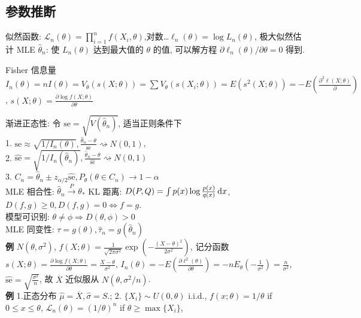 \documentclass[a4paper, landscape,10pt]{article}
\begin{document}
\begin{multicols}{4}
\begin{scriptsize}
\section{参数推断}
似然函数: $\mathcal{L}_n(\theta) = \prod_{i = 1}^n f(X_i, \theta)$,对数\dots $\ell_n(\theta) = \log L_n(\theta)$, 极大似然估计 MLE $\hat \theta_n$: 使 $L_n(\theta)$ 达到最大值的 $\theta$ 的值, 可以解方程 $\partial \ell_n(\theta) / \partial \theta = 0$ 得到. \begin{small}
Fisher 信息量 $I_n(\theta) = n I(\theta) = V_\theta (s(X; \theta))
= \sum V_\theta(s(X_i; \theta)) = E(s^2(X; \theta)) = -E(\frac{\partial ^2 \ell (X; \theta)}{\partial})$, $s(X; \theta) = \frac {\partial \log f(X; \theta)} {\partial \theta}$\\
\end{small}
渐进正态性: 令 $\mathrm{se} = \sqrt{V(\hat \theta_n)}$, 适当正则条件下 \\
1. $\mathrm{se} \approx \sqrt{1 / I_n(\theta)}, \frac{\hat \theta_n - \theta}{\mathrm{se}} \rightsquigarrow N(0, 1)$, \\
2. $\hat {\mathrm{se}} = \sqrt{1 / I_n(\hat \theta_n)}, \frac{\hat \theta_n - \theta}{\hat {\mathrm{se}}} \rightsquigarrow N(0, 1)$\\
3. $C_n = \hat \theta_n \pm z_{\alpha/2} \hat {\mathrm{se}}, P_\theta(\theta \in C_n) \rightarrow 1 - \alpha$\\
MLE 相合性: $\hat \theta_n \xrightarrow{P} \theta_*$
KL 距离: $D(P, Q) = \int p(x) \log \frac{p(x)}{q(x)} \,\mathrm{d} x$, $D(f, g)\geq 0, D(f, g) = 0 \Leftrightarrow f = g$.\\
模型可识别: $\theta \neq \phi \Rightarrow D(\theta, \phi) > 0$\\
MLE 同变性: $\tau = g(\theta), \hat \tau_n = g(\hat \theta_n)$\\
{\bfseries 例} $N(\theta, \sigma ^ 2)$,
$f(X; \theta) = \frac{1}{\sqrt{2\pi\sigma^2}} \exp \left( - \frac{(X - \theta)^2}{2\sigma^2} \right)$,
记分函数 $s(X; \theta) = \frac{\partial \log f(X; \theta)}{\partial \theta} = \frac{X - \theta}{\sigma^2}$,
$I_n(\theta) = -E(\frac {\partial \ell ^ 2(\theta)} {\partial \theta}) = 
-n E_\theta(-\frac 1 {\sigma^2}) = \frac {n} {\sigma^2}$,
$\hat {\mathrm{se}} = \sqrt{\frac{\sigma^2}{n}}$, 故 $\overline X$ 近似服从 $N(\theta, \sigma^2 / n)$. \\
{\bfseries 例} 1.正态分布 $\hat \mu = \overline X, \hat \sigma = S.$;
2. $\{X_i\} \sim U(0, \theta)$ i.i.d.,
$f(x; \theta) = 1/\theta$ if $0\leq x\leq \theta$,
$\mathcal{L}_n(\theta) = (1/\theta)^n$ if $\theta \geq \max \{X_i\}$,

\end{scriptsize}
\end{multicols}
\end{document}
